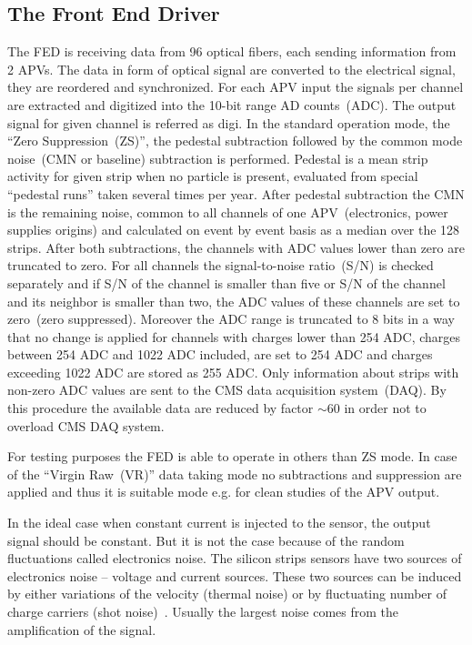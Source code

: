 
\subsection{The Front End Driver}


The FED is receiving data from 96 optical fibers, each sending information from 2 APVs. The data in form of optical signal are converted to the electrical signal, they are reordered and synchronized. For each APV input the signals per channel are extracted and digitized into the 10-bit range AD counts~(ADC). The output signal for given channel is referred as digi. In the standard operation mode, the ``Zero Suppression~(ZS)'', the pedestal subtraction followed by the common mode noise~(CMN or baseline) subtraction is performed. Pedestal is a mean strip activity for given strip when no particle is present, evaluated from special ``pedestal runs'' taken several times per year. After pedestal subtraction the CMN is the remaining noise, common to all channels of one APV~(electronics, power supplies origins) and calculated on event by event basis as a median over the 128 strips. After both subtractions, the channels with ADC values lower than zero are truncated to zero. For all channels the signal-to-noise ratio~(S/N) is checked separately and if S/N of the channel is smaller than five or S/N of the channel and its neighbor is smaller than two, the ADC values of these channels are set to zero~(zero suppressed). Moreover the ADC range is truncated to 8 bits in a way that no change is applied for channels with charges lower than 254 ADC, charges between 254 ADC and 1022 ADC included, are set to 254 ADC and charges exceeding 1022 ADC are stored as 255 ADC. Only information about strips with non-zero ADC values are sent to the CMS data acquisition system~(DAQ). By this procedure the available data are reduced by factor $\sim$60 in order not to overload CMS DAQ system.

For testing purposes the FED is able to operate in others than ZS mode. In case of the ``Virgin Raw~(VR)'' data taking mode no subtractions and suppression are applied and thus it is suitable mode e.g. for clean studies of the APV output.

In the ideal case when constant current is injected to the sensor, the output signal should be constant. But it is not the case because of the random fluctuations called electronics noise. The silicon strips sensors have two sources of electronics noise -- voltage and current sources. These two sources can be induced by either variations of the velocity (thermal noise) or by fluctuating number of charge carriers (shot noise)~\cite{website:noise}. Usually the largest noise comes from the amplification of the signal. 


